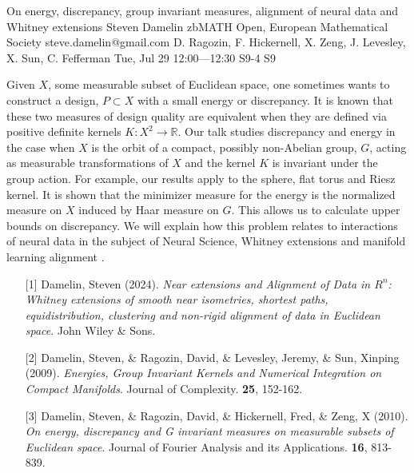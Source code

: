 \begin{talk}
  {On energy, discrepancy, group  invariant measures, alignment of neural data and Whitney extensions}%
  {Steven Damelin}%
  {zbMATH Open, European Mathematical Society}%
  {steve.damelin@gmail.com}%
  {D. Ragozin, F. Hickernell, X. Zeng, J. Levesley, X. Sun, C. Fefferman}%
  {}%
  {Tue, Jul 29 12:00---12:30}%
  {S9-4}%
  {S9}%
  
    
   
Given $X$, some measurable subset of Euclidean space, one sometimes wants to construct a design, $P\subset X$ with a small energy or discrepancy. It is known that these two measures of design quality are equivalent when they are defined via positive definite kernels $K:X^2\to \mathbb R$. Our talk studies discrepancy and energy in the case when $X$ is the orbit of a compact, possibly non-Abelian group, $G$, acting as measurable transformations of $X$ and the kernel $K$ is invariant under the group action. For example, our results apply to the sphere, flat torus and Riesz kernel. It is shown that the minimizer measure for the energy is the normalized measure on $X$ induced by Haar measure on $G$. This allows us to calculate upper bounds on discrepancy. We will explain how this problem relates to interactions of neural data in the subject of Neural Science, Whitney extensions and manifold learning alignment . 


\medskip

\begin{enumerate}
 \item[{[1]}] Damelin, Steven (2024). {\it Near extensions and Alignment of Data in $R^n$: Whitney extensions of smooth near isometries, shortest paths, equidistribution, clustering and non-rigid alignment of data in Euclidean space}. John Wiley \& Sons.
        \item[{[2]}] Damelin, Steven, \& Ragozin, David, \& Levesley, Jeremy, \& Sun, Xinping (2009). {\it Energies, Group Invariant Kernels and Numerical Integration on Compact Manifolds}. Journal of Complexity. \textbf{25}, 152-162.
        \item[{[3]}] Damelin, Steven, \& Ragozin, David, \& Hickernell, Fred, \& Zeng, X (2010). {\it  On energy, discrepancy and G invariant measures on measurable subsets of Euclidean space}. Journal of Fourier Analysis and its Applications. \textbf{16}, 813-839.
\end{enumerate}

\end{talk}


